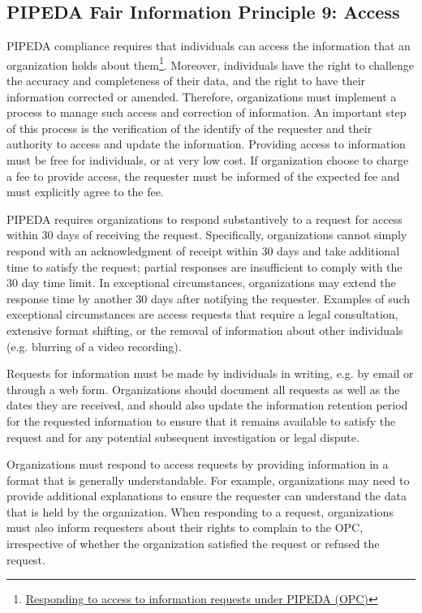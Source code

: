 \subsection*{PIPEDA Fair Information Principle 9: Access}

PIPEDA compliance requires that individuals can access the information that an organization holds about them\footnote{\href{https://www.priv.gc.ca/en/privacy-topics/accessing-personal-information/obligations-for-organizations/02_05_d_54_ati_02/}{Responding to access to information requests under PIPEDA (OPC)}}. Moreover, individuals have the right to challenge the accuracy and completeness of their data, and the right to have their information corrected or amended. Therefore, organizations must implement a process to manage such access and correction of information. An important step of this process is the verification of the identify of the requester and their authority to access and update the information. Providing access to information must be free for individuals, or at very low cost. If organization choose to charge a fee to provide access, the requester must be informed of the expected fee and must explicitly agree to the fee.

PIPEDA requires organizations to respond substantively to a request for access within 30 days of receiving the request. Specifically, organizations cannot simply respond with an acknowledgment of receipt within 30 days and take additional time to satisfy the request; partial responses are insufficient to comply with the 30 day time limit. In exceptional circumstances, organizations may extend the response time by another 30 days after notifying the requester. Examples of such exceptional circumstances are access requests that require a legal consultation, extensive format shifting, or the removal of information about other individuals (e.g. blurring of a video recording). 

Requests for information must be made by individuals in writing, e.g. by email or through a web form. Organizations should document all requests as well as the dates they are received, and should also update the information retention period for the requested information to ensure that it remains available to satisfy the request and for any potential subsequent investigation or legal dispute.

Organizations must respond to access requests by providing information in a format that is generally understandable. For example, organizations may need to provide additional explanations to ensure the requester can understand the data that is held by the organization. When responding to a request, organizations must also inform requesters about their rights to complain to the OPC, irrespective of whether the organization satisfied the request or refused the request. 

